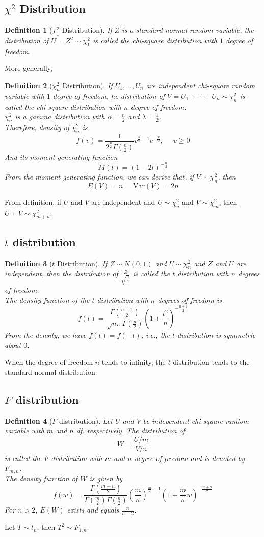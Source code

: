 \documentclass[12pt]{article}
\newcommand{\var}{\mathrm{Var}}
\newtheorem{definition}{Definition}[section]
\theoremstyle{definition}
\begin{document}
\subsection{{$\chi^2$} Distribution}
\begin{definition}[{$\chi^2_1$} Distribution]
\normalfont If $Z$ is a standard normal random variable, the distribution of $U=Z^2\sim \chi^2_1$ is called the chi-square distribution with $1$ degree of freedom.
\end{definition}
More generally,
\begin{definition}[{$\chi^2_n$} Distribution]
\normalfont If $U_1,\ldots, U_n$ are independent chi-square random variable with $1$ degree of freedom, he distribution of $V=U_1+\cdots+U_n \sim \chi_n^2$ is called the chi-square distribution with $n$ degree of freedom.\\
$\chi_n^2$ is a gamma distribution with $\alpha=\frac{n}{2}$ and $\lambda=\frac{1}{2}$.\\
Therefore, density of $\chi_n^2$ is
\[
f(v) = \frac{1}{2^{\frac{n}{2}}\Gamma(\frac{n}{2})}v^{\frac{n}{2}-1}e^{-\frac{v}{2}},\;\;\;\;\;v\geq 0
\]
And its moment generating function 
\[
M(t) = (1-2t)^{-\frac{n}{2}}
\]
From the moment generating function, we can derive that, if $V\sim \chi_n^2$, then
\[
E(V)=n\;\;\;\;\; \var(V) = 2n
\]
\end{definition}
From definition, if $U$ and $V$ are independent and $U\sim \chi_n^2$ and $V\sim\chi_m^2$, then $U+V\sim\chi_{m+n}^2$.
\subsection{{$t$} distribution}
\begin{definition}[{$t$} Distribution]
\normalfont If $Z\sim N(0,1)$ and $U\sim \chi_n^2$ and $Z$ and $U$ are independent, then the distribution of $\frac{Z}{\sqrt{\frac{U}{n}}}$ is called the $t$ distribution with $n$ degrees of freedom.\\
The density function of the $t$ distribution with $n$ degrees of freedom is
\[
f(t) = \frac{\Gamma(\frac{n+1}{2})}{\sqrt{n\pi}\Gamma(\frac{n}{2})}(1+\frac{t^2}{n})^{-\frac{n+1}{2}}
\]
From the density, we have $f(t) = f(-t)$, i.e., the $t$ distribution is symmetric about $0$.
\end{definition}
When the degree of freedom $n$ tends to infinity, the $t$ distribution tends to the standard normal distribution.
\subsection{{$F$} distribution}
\begin{definition}[{$F$} distribution]
\normalfont Let $U$ and $V$ be independent chi-square random variable with $m$ and $n$ df, respectively. The distribution of
\[
W=\frac{U/m}{V/n}
\]
is called the $F$ distribution with $m$ and $n$ degree of freedom and is denoted by $F_{m,n}$.\\
The density function of $W$ is given by
\[
f(w) = \frac{\Gamma(\frac{m+n}{2})}{\Gamma(\frac{m}{2})\Gamma(\frac{n}{2})}(\frac{m}{n})^{\frac{m}{2}-1}(1+\frac{m}{n}w)^{-\frac{m+n}{2}}
\]
For $n>2$, $E(W)$ exists and equals $\frac{n}{n-2}$.
\end{definition}
Let $T\sim t_n$, then $T^2\sim F_{1,n}$.
\end{document}

